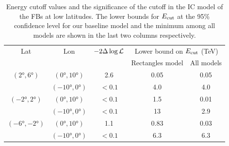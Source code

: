 %

\begin{table}
  \begin{center}
    \caption{Energy cutoff values and the significance of the cutoff in the IC model of the FBs at low latitudes.
The lower bounds for $E_{\text{cut}}$ at the 95\% confidence level for our baseline model and the minimum among all
models are shown in the last two columns respectively.
}
    \label{tab:IC}
    \begin{tabular}{|c|c|c|c|c|} %
     	\hline
		 Lat & Lon  & $-2 \Delta \log {\mathcal{L}}$ & \multicolumn{2}{c|}{Lower bound on $E_{\text{cut}}$ (TeV) } \\ 
		       &        &                                  &  \multicolumn{1}{c}{Rectangles model} & All models \\ 
		\hline
  		$(\ang{2}, \ang{6})$ & $(\ang{0}, \ang{10})$ & 2.6  & 0.05 & 0.05 \\ 
		& $(\ang{-10}, \ang{0})$ & $ < 0.1$  & 4.0  & 4.0 \\ 
 		\hline
  		$(\ang{-2}, \ang{2})$ & $(\ang{0}, \ang{10})$ & $ < 0.1$ & 1.5 & 0.01 \\ 
		& $(\ang{-10}, \ang{0})$ & $ < 0.1$ & 13  & 2.9  \\ 
 		\hline
  		$(\ang{-6}, \ang{-2})$ & $(\ang{0}, \ang{10})$ & 1.1 & 0.83 & 0.03 \\ 
		& $(\ang{-10}, \ang{0})$& $ < 0.1$ & 6.3 & 6.3\\ 
 \hline
    \end{tabular}
  \end{center}
\end{table}





